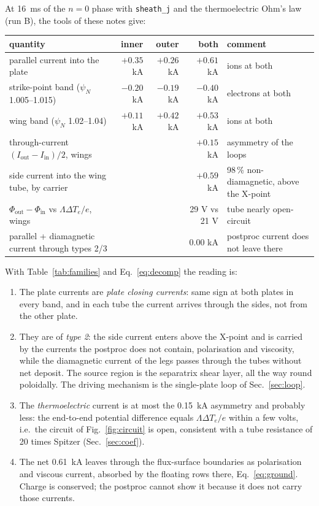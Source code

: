 \documentclass[11pt,a4paper]{article}
\newcommand{\Te}{T_e}
\newcommand{\code}[1]{\texttt{#1}}
\begin{document}
At 16~ms of the $n=0$ phase with \code{sheath\_j} and the thermoelectric Ohm's law (run B), the tools of these notes give:

\begin{center}
\small
\begin{tabular}{p{5.2cm}rrrp{4.2cm}}
\toprule
quantity & inner & outer & both & comment \\
\midrule
parallel current into the plate & $+0.35$ kA & $+0.26$ kA & $+0.61$ kA & ions at both \\
strike-point band ($\psi_N$ 1.005--1.015) & $-0.20$ kA & $-0.19$ kA & $-0.40$ kA & electrons at both \\
wing band ($\psi_N$ 1.02--1.04) & $+0.11$ kA & $+0.42$ kA & $+0.53$ kA & ions at both \\
through-current $(I_{\mathrm{out}}-I_{\mathrm{in}})/2$, wings & & & $+0.15$ kA & asymmetry of the loops \\
side current into the wing tube, by carrier & & & $+0.59$ kA & 98\,\% non-diamagnetic, above the X-point \\
$\Phi_{\mathrm{out}}-\Phi_{\mathrm{in}}$ vs $\Lambda\Delta\Te/e$, wings & & & 29 V vs 21 V & tube nearly open-circuit \\
parallel + diamagnetic current through types 2/3 & & & $0.00$ kA & postproc current does not leave there \\
\bottomrule
\end{tabular}
\end{center}

With Table~\ref{tab:families} and Eq.~\eqref{eq:decomp} the reading is:
\begin{enumerate}
\item The plate currents are \emph{plate closing currents}: same sign at both plates in every band, and in each tube
      the current arrives through the sides, not from the other plate.
\item They are of \emph{type 2}: the side current enters above the X-point and is carried by the currents the
      postproc does not contain, polarisation and viscosity, while the diamagnetic current of the legs passes through
      the tubes without net deposit. The source region is the separatrix shear layer, all the way round poloidally.
      The driving mechanism is the single-plate loop of Sec.~\ref{sec:loop}.
\item The \emph{thermoelectric} current is at most the 0.15~kA asymmetry and probably less: the end-to-end potential
      difference equals $\Lambda\Delta\Te/e$ within a few volts, i.e.\ the circuit of Fig.~\ref{fig:circuit} is open,
      consistent with a tube resistance of 20 times Spitzer (Sec.~\ref{sec:coef}).
\item The net 0.61~kA leaves through the flux-surface boundaries as polarisation and viscous current, absorbed by the
      floating rows there, Eq.~\eqref{eq:ground}. Charge is conserved; the postproc cannot show it because it does
      not carry those currents.
\end{enumerate}
\end{document}
